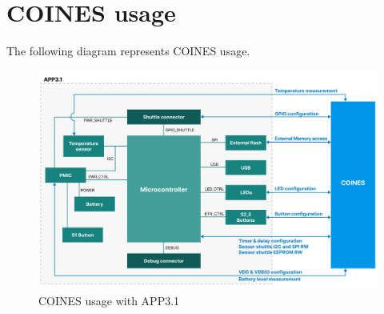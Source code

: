 \documentclass{article}
\begin{document}
\section{COINES usage}
The following diagram represents COINES usage.
\begin{figure}[H]
	\begin{center}
		\includegraphics[width=1.1\textwidth]{coinesAPI_images/COINES_block_diagram.png}
		\caption{COINES usage with APP3.1}
	\end{center}
\end{figure}
\end{document}
